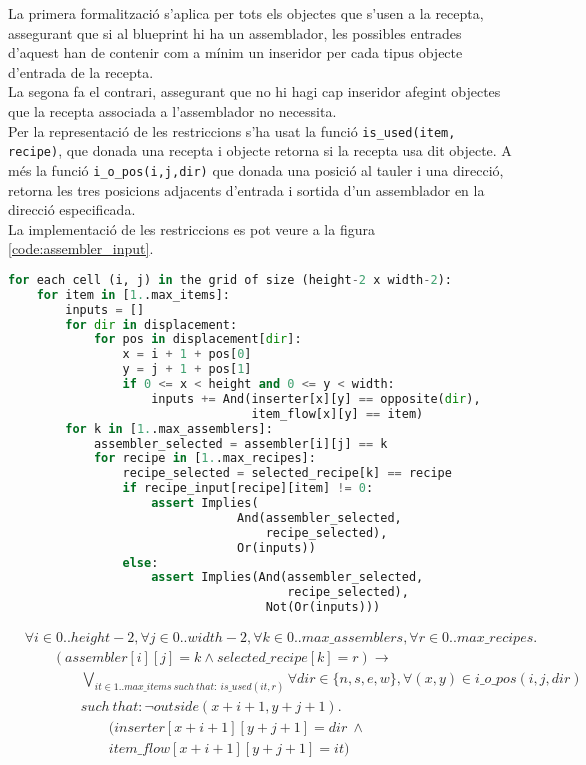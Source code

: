 La primera formalització s'aplica per tots els objectes que s'usen a la recepta, assegurant que si al blueprint hi ha un assemblador, les possibles entrades d'aquest han de contenir com a mínim un inseridor per cada tipus objecte d'entrada de la recepta.\\
La segona fa el contrari, assegurant que no hi hagi cap inseridor afegint objectes que la recepta associada a l'assemblador no necessita.\\
Per la representació de les restriccions s'ha usat la funció \lstinline{is_used(item, recipe)}, que donada una recepta i objecte retorna si la recepta usa dit objecte. A més la funció \lstinline{i_o_pos(i,j,dir)} que donada una posició al tauler i una direcció, retorna les tres posicions adjacents d'entrada i sortida d'un assemblador en la direcció especificada.\\
La implementació de les restriccions es pot veure a la figura \ref{code:assembler_input}.

\begin{lstlisting}[language=Python, caption=Assembler Input, label=code:assembler_input]
for each cell (i, j) in the grid of size (height-2 x width-2):
    for item in [1..max_items]:
        inputs = []
        for dir in displacement:
            for pos in displacement[dir]:
                x = i + 1 + pos[0]
                y = j + 1 + pos[1]
                if 0 <= x < height and 0 <= y < width:
                    inputs += And(inserter[x][y] == opposite(dir),
                                  item_flow[x][y] == item)
        for k in [1..max_assemblers]:
            assembler_selected = assembler[i][j] == k
            for recipe in [1..max_recipes]:
                recipe_selected = selected_recipe[k] == recipe
                if recipe_input[recipe][item] != 0:
                    assert Implies(
                                And(assembler_selected,
                                    recipe_selected),
                                Or(inputs))
                else:
                    assert Implies(And(assembler_selected,
                                       recipe_selected),
                                    Not(Or(inputs)))
\end{lstlisting}

\begin{align*}
    &\forall i \in 0..height-2, \forall j \in 0..width-2, \forall k \in 0..max\_assemblers, \forall r \in 0..max\_recipes.\\
    &\qquad (assembler[i][j]=k \land selected\_recipe[k]=r)\rightarrow\\
    &\qquad \qquad \bigvee_{it \in 1..max\_items \ such \ that: \ is\_used(it, r)} \forall dir\in\{n,s,e,w\},\forall (x,y)\in i\_o\_pos(i,j,dir)\\
    &\qquad \qquad such \ that: \lnot outside(x+i+1, y+j+1).\\
    &\qquad \qquad \qquad (inserter[x+i+1][y+j+1]=dir \ \land\\
    &\qquad \qquad \qquad item\_flow[x+i+1][y+j+1]=it)
\end{align*}

